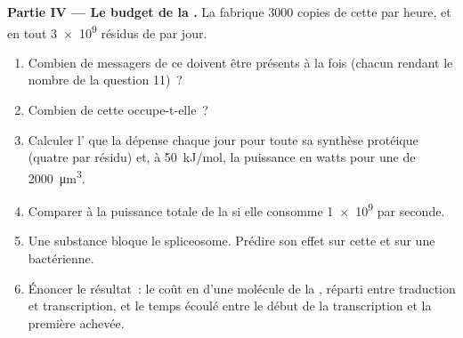 \begin{problem}
\medskip
\noindent\textbf{Partie IV --- Le budget de la .}
La  fabrique \num{3000} copies de cette  par heure, et en
tout \num{3e9} résidus de  par jour.
\begin{enumerate}[resume]
  \item Combien de messagers de ce  doivent être présents à la fois
        (chacun rendant le nombre de la question 11)~?
  \item Combien de  cette  occupe-t-elle~?
  \item Calculer l' que la  dépense chaque jour pour toute sa
        synthèse protéique (quatre par résidu) et, à \qty{50}{kJ/mol},
        la puissance en watts pour une  de
        \qty{2000}{\micro m^3}.
  \item Comparer à la puissance totale de la  si elle consomme
        \qty{1e9}{}  par seconde.
  \item Une substance bloque le spliceosome. Prédire son effet sur cette
         et sur une  bactérienne.
  \item Énoncer le résultat~: le coût en  d'une molécule de la
        , réparti entre traduction et transcription, et le temps
        écoulé entre le début de la transcription et la première
         achevée.
\end{enumerate}
\end{problem}
